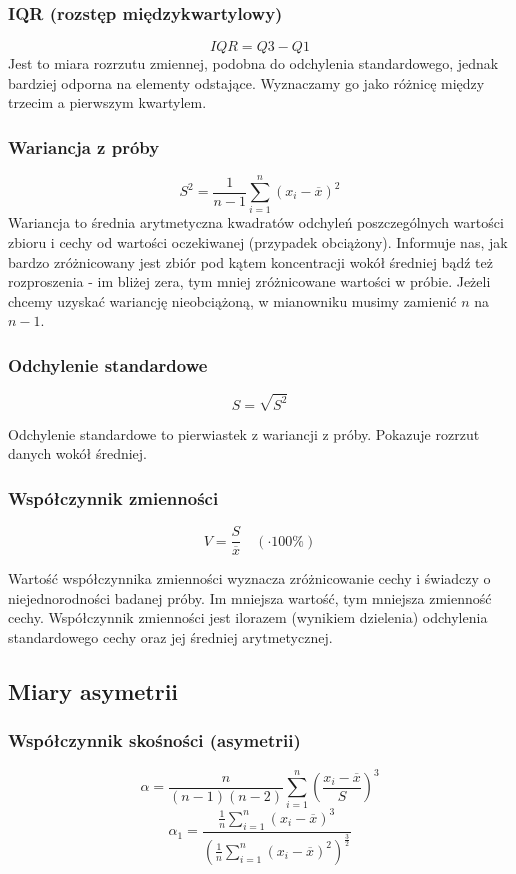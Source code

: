 \documentclass{article}
\theoremstyle{break}
\begin{document}
	\subsubsection{IQR (rozstęp międzykwartylowy)}
	$$IQR=Q3-Q1$$
	Jest to miara rozrzutu zmiennej, podobna do odchylenia standardowego, jednak bardziej odporna na elementy odstające. Wyznaczamy go jako różnicę między trzecim a pierwszym kwartylem.
	\subsubsection{Wariancja z próby}
	$$S^2=\frac{1}{n-1}\sum\limits_{i=1}^{n}(x_i - \overline{x})^2$$
	Wariancja to średnia arytmetyczna kwadratów odchyleń poszczególnych wartości zbioru i cechy od wartości oczekiwanej (przypadek obciążony).  Informuje nas, jak bardzo zróżnicowany jest zbiór pod kątem koncentracji wokół średniej bądź też rozproszenia - im bliżej zera, tym mniej zróżnicowane wartości w próbie. Jeżeli chcemy uzyskać wariancję nieobciążoną, w mianowniku musimy zamienić $n$ na $n-1$.
	\subsubsection{Odchylenie standardowe}
	
	$$S=\sqrt{S^2}$$
	
	Odchylenie standardowe to pierwiastek z wariancji z próby. Pokazuje rozrzut danych wokół średniej.
	
	\subsubsection{Współczynnik zmienności}
	$$V=\frac{S}{\overline{x}} \quad (\cdot 100\%)$$
	
	Wartość współczynnika zmienności wyznacza zróżnicowanie cechy i świadczy o niejednorodności badanej próby. Im mniejsza wartość, tym mniejsza zmienność cechy. Współczynnik zmienności jest ilorazem (wynikiem dzielenia) odchylenia standardowego cechy oraz jej średniej arytmetycznej.
	
	\subsection{Miary asymetrii}
	\subsubsection{Współczynnik skośności (asymetrii)}
	
	$$\alpha =\frac{n}{(n-1)(n-2)}\sum\limits_{i=1}^{n}(\frac{x_i-\overline{x}}{S})^3$$
	$$\alpha_1 =\frac{\frac{1}{n}\sum\limits_{i=1}^{n}(x_i-\overline{x})^3}{(\frac{1}{n}\sum\limits_{i=1}^{n}(x_i-\overline{x})^2)^{\frac{3}{2}}}$$
	
\end{document}

